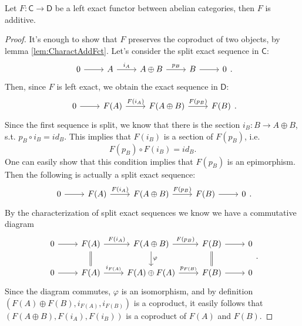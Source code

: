 \documentclass[../Main]{subfiles}
\begin{document}
\begin{lem}
	Let $F\colon \mathsf{C} \to \mathsf{D}$ be a left exact functor between
	abelian categories, then $F$ is additive.
\end{lem} 
\begin{proof}
	It's enough to show that $F$ preserves the coproduct of
	two objects, by lemma \ref{lem:CharactAddFct}.
	Let's consider the split exact sequence in $\mathsf{C}$:
	\begin{equation}
	\begin{tikzcd}
		0 \arrow[r, "", rightarrow] &
		A \arrow[r, "i_A", rightarrow] &
		A \oplus B \arrow[r, "p_B", rightarrow] &
		B \arrow[r, "", rightarrow] &
		0
	\end{tikzcd}
	.\end{equation} 
	Then, since $F$ is left exact, we obtain the exact sequence in $\mathsf{D}$:
	\begin{equation}
	\begin{tikzcd}
		0 \arrow[r, "", rightarrow] &
		F(A) \arrow[r, "F(i_A)", rightarrow] &
		F(A \oplus B) \arrow[r, "F(p_B)", rightarrow] &
		F(B)
	\end{tikzcd}
	.\end{equation} 
	Since the first sequence is split, we know that there is the section $i_B: B \to A \oplus B$,
	s.t. $p_B \circ i_B = id_B$.
	This implies that $F(i_B)$ is a section of $F(p_B)$, i.e.
	\begin{equation}
		F(p_B) \circ F(i_B) = id_B
	.\end{equation} 
	One can easily show that this condition implies that $F(p_B)$ is an epimorphism.
	Then the following is actually a split exact sequence:
	\begin{equation}
	\begin{tikzcd}
		0 \arrow[r, "", rightarrow] &
		F(A) \arrow[r, "F(i_A)", rightarrow] &
		F(A \oplus B) \arrow[r, "F(p_B)", rightarrow] &
		F(B) \arrow[r, "", rightarrow] &
		0
	\end{tikzcd}
	.\end{equation} 
	By the characterization of split exact sequences we know we have a commutative diagram
	\begin{equation}
	\begin{tikzcd}
		0 \arrow[r, "", rightarrow] &
		F(A) \arrow[r, "F(i_A)", rightarrow] \arrow[d, "", equals] &
		F(A \oplus B) \arrow[r, "F(p_B)", rightarrow] \arrow[d, "\varphi", rightarrow] &
		F(B) \arrow[r, "", rightarrow] \arrow[d, "", equals] &
		0\\
		0 \arrow[r, "", rightarrow] &
		F(A) \arrow[r, "i_{F(A)}", rightarrow] &
		F(A) \oplus F(A) \arrow[r, "p_{F(B)}", rightarrow] &
		F(B) \arrow[r, "", rightarrow] &
		0
	\end{tikzcd}
	.\end{equation} 
	Since the diagram commutes, $\varphi$ is an isomorphism, and by definition
	$\left(F(A) \oplus F(B), i_{F(A)}, i_{F(B)}\right)$ is a coproduct,
	it easily follows that $\left(F(A \oplus B), F(i_A), F(i_B)\right)$
	is a coproduct of $F(A)$ and $F(B)$.
\end{proof}
\end{document}
